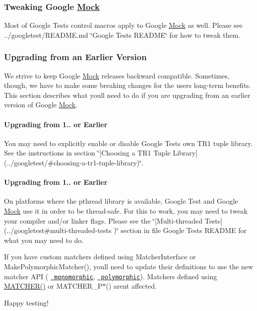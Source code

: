 \subsubsection*{Tweaking Google \mbox{\hyperlink{classMock}{Mock}}}

Most of Google Test\textquotesingle{}s control macros apply to Google \mbox{\hyperlink{classMock}{Mock}} as well. Please see ../googletest/\+R\+E\+A\+D\+ME.md \char`\"{}\+Google Test\textquotesingle{}s R\+E\+A\+D\+M\+E\char`\"{} for how to tweak them.

\subsubsection*{Upgrading from an Earlier Version}

We strive to keep Google \mbox{\hyperlink{classMock}{Mock}} releases backward compatible. Sometimes, though, we have to make some breaking changes for the users\textquotesingle{} long-\/term benefits. This section describes what you\textquotesingle{}ll need to do if you are upgrading from an earlier version of Google \mbox{\hyperlink{classMock}{Mock}}.

\paragraph*{Upgrading from 1.. or Earlier}

You may need to explicitly enable or disable Google Test\textquotesingle{}s own T\+R1 tuple library. See the instructions in section \char`\"{}\mbox{[}\+Choosing a T\+R1 Tuple
\+Library\mbox{]}(../googletest/\#choosing-\/a-\/tr1-\/tuple-\/library)\char`\"{}.

\paragraph*{Upgrading from 1.. or Earlier}

On platforms where the pthread library is available, Google Test and Google \mbox{\hyperlink{classMock}{Mock}} use it in order to be thread-\/safe. For this to work, you may need to tweak your compiler and/or linker flags. Please see the \char`\"{}\mbox{[}\+Multi-\/threaded Tests\mbox{]}(../googletest\#multi-\/threaded-\/tests
)\char`\"{} section in file Google Test\textquotesingle{}s R\+E\+A\+D\+ME for what you may need to do.

If you have custom matchers defined using {\ttfamily Matcher\+Interface} or {\ttfamily Make\+Polymorphic\+Matcher()}, you\textquotesingle{}ll need to update their definitions to use the new matcher A\+PI ( \href{./docs/CookBook.md\#writing-new-monomorphic-matchers}{\texttt{ monomorphic}}, \href{./docs/CookBook.md\#writing-new-polymorphic-matchers}{\texttt{ polymorphic}}). Matchers defined using {\ttfamily \mbox{\hyperlink{gmock-generated-matchers_8h_af4fe73ff8e2b0494f4970b575b65ddff}{M\+A\+T\+C\+H\+E\+R()}}} or {\ttfamily M\+A\+T\+C\+H\+E\+R\+\_\+\+P$\ast$()} aren\textquotesingle{}t affected.

Happy testing! 